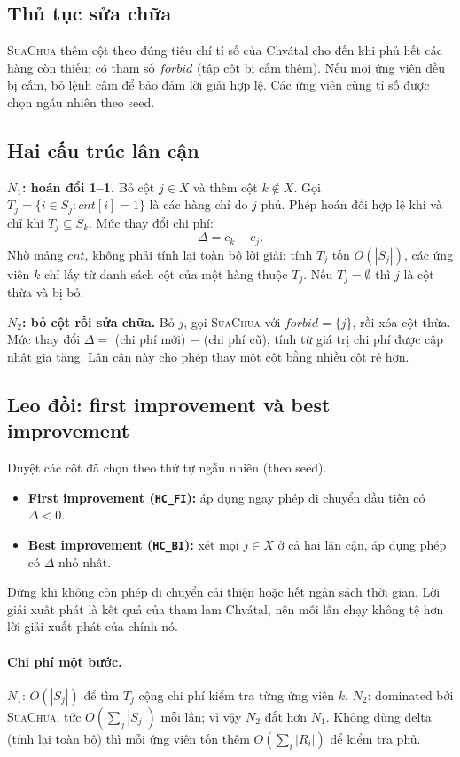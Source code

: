 \subsection{Thủ tục sửa chữa}
\textsc{SuaChua} thêm cột theo đúng tiêu chí tỉ số của Chvátal cho đến khi phủ hết các hàng còn thiếu; có tham số $forbid$ (tập cột bị cấm thêm).
Nếu mọi ứng viên đều bị cấm, bỏ lệnh cấm để bảo đảm lời giải hợp lệ. Các ứng viên cùng tỉ số được chọn ngẫu nhiên theo seed.

\subsection{Hai cấu trúc lân cận}
\textbf{$N_1$: hoán đổi 1--1.} Bỏ cột $j\in X$ và thêm cột $k\notin X$. Gọi $T_j=\{i\in S_j: cnt[i]=1\}$ là các hàng chỉ do $j$ phủ.
Phép hoán đổi hợp lệ khi và chỉ khi $T_j\subseteq S_k$. Mức thay đổi chi phí:
\[
\Delta = c_k - c_j .
\]
Nhờ mảng $cnt$, không phải tính lại toàn bộ lời giải: tính $T_j$ tốn $O(|S_j|)$, các ứng viên $k$ chỉ lấy từ danh sách cột của một hàng thuộc $T_j$.
Nếu $T_j=\emptyset$ thì $j$ là cột thừa và bị bỏ.

\textbf{$N_2$: bỏ cột rồi sửa chữa.} Bỏ $j$, gọi \textsc{SuaChua} với $forbid=\{j\}$, rồi xóa cột thừa.
Mức thay đổi $\Delta=$ (chi phí mới) $-$ (chi phí cũ), tính từ giá trị chi phí được cập nhật gia tăng. Lân cận này cho phép thay một cột bằng nhiều cột rẻ hơn.

\subsection{Leo đồi: first improvement và best improvement}
Duyệt các cột đã chọn theo thứ tự ngẫu nhiên (theo seed).
\begin{itemize}
  \item \textbf{First improvement (\texttt{HC\_FI}):} áp dụng ngay phép di chuyển đầu tiên có $\Delta<0$.
  \item \textbf{Best improvement (\texttt{HC\_BI}):} xét mọi $j\in X$ ở cả hai lân cận, áp dụng phép có $\Delta$ nhỏ nhất.
\end{itemize}
Dừng khi không còn phép di chuyển cải thiện hoặc hết ngân sách thời gian.
Lời giải xuất phát là kết quả của tham lam Chvátal, nên mỗi lần chạy không tệ hơn lời giải xuất phát của chính nó.

\paragraph{Chi phí một bước.} $N_1$: $O(|S_j|)$ để tìm $T_j$ cộng chi phí kiểm tra từng ứng viên $k$.
$N_2$: dominated bởi \textsc{SuaChua}, tức $O(\sum_j |S_j|)$ mỗi lần; vì vậy $N_2$ đắt hơn $N_1$.
Không dùng delta (tính lại toàn bộ) thì mỗi ứng viên tốn thêm $O(\sum_{i}|R_i|)$ để kiểm tra phủ.

